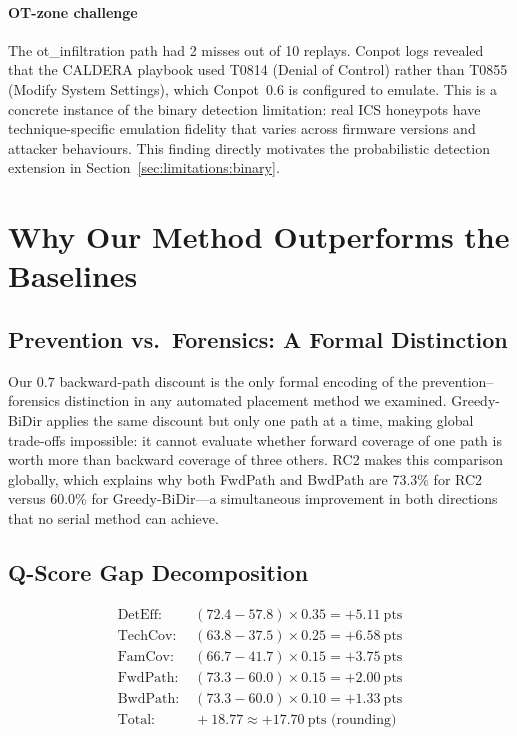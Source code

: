 \documentclass[journal]{IEEEtran}
\begin{document}
\paragraph{OT-zone challenge}
The ot\_infiltration path had 2 misses out of 10 replays. Conpot
logs revealed that the CALDERA playbook used T0814 (Denial of Control)
rather than T0855 (Modify System Settings), which Conpot~0.6 is
configured to emulate. This is a concrete instance of the binary
detection limitation: real ICS honeypots have technique-specific
emulation fidelity that varies across firmware versions and attacker
behaviours. This finding directly motivates the probabilistic
detection extension in Section~\ref{sec:limitations:binary}.

\section{Why Our Method Outperforms the Baselines}
\label{sec:why}

\subsection{Prevention vs.\ Forensics: A Formal Distinction}
Our $0.7$ backward-path discount is the only formal encoding of the
prevention--forensics distinction in any automated placement method
we examined. Greedy-BiDir applies the same discount but only one
path at a time, making global trade-offs impossible: it cannot
evaluate whether forward coverage of one path is worth more than
backward coverage of three others. RC2 makes this comparison
globally, which explains why both FwdPath and BwdPath are 73.3\%
for RC2 versus 60.0\% for Greedy-BiDir---a simultaneous improvement
in both directions that no serial method can achieve.

\subsection{Q-Score Gap Decomposition}
\begin{align*}
\text{DetEff:}  &\;(72.4-57.8)\times0.35 = +5.11~\text{pts}\\
\text{TechCov:} &\;(63.8-37.5)\times0.25 = +6.58~\text{pts}\\
\text{FamCov:}  &\;(66.7-41.7)\times0.15 = +3.75~\text{pts}\\
\text{FwdPath:} &\;(73.3-60.0)\times0.15 = +2.00~\text{pts}\\
\text{BwdPath:} &\;(73.3-60.0)\times0.10 = +1.33~\text{pts}\\
\text{Total:}   &\;+18.77\approx+17.70~\text{pts (rounding)}
\end{align*}
\end{document}
